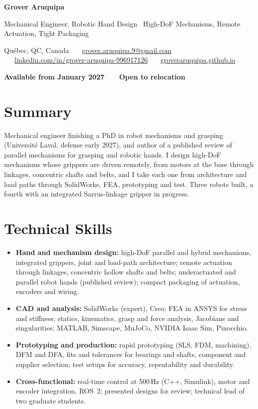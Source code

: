 \documentclass[10pt,letterpaper]{article}
\begin{document}
{\LARGE\bfseries Grover Aruquipa}\par\vspace{2pt}
{\large Mechanical Engineer, Robotic Hand Design \textbar\ High-DoF Mechanisms, Remote Actuation, Tight Packaging}\par\vspace{3pt}
{\small Qu\'ebec, QC, Canada \ \textbullet\ \
\href{mailto:grover.aruquipa.9@gmail.com}{grover.aruquipa.9@gmail.com} \ \textbullet\ \
\href{https://www.linkedin.com/in/grover-aruquipa-996917126}{linkedin.com/in/grover-aruquipa-996917126} \ \textbullet\ \
\href{https://groveraruquipa.github.io}{groveraruquipa.github.io}}\par\vspace{1pt}
{\small\bfseries Available from January 2027 \ \textbullet\ \ Open to relocation}\par


\section{Summary}
Mechanical engineer finishing a PhD in robot mechanisms and grasping (Universit\'e Laval, defense early 2027), and
author of a published review of parallel mechanisms for grasping and robotic hands. I design high-DoF mechanisms whose
grippers are driven remotely, from motors at the base through linkages, concentric shafts and belts, and I take each one
from architecture and load paths through SolidWorks, FEA, prototyping and test. Three robots built, a fourth with an
integrated Sarrus-linkage gripper in progress.

\section{Technical Skills}
\begin{itemize}
\item \textbf{Hand and mechanism design:} high-DoF parallel and hybrid mechanisms, integrated grippers, joint and load-path
architecture; remote actuation through linkages, concentric hollow shafts and belts; underactuated and parallel robot
hands (published review); compact packaging of actuation, encoders and wiring.
\item \textbf{CAD and analysis:} SolidWorks (expert), Creo; FEA in ANSYS for stress and stiffness; statics, kinematics,
grasp and force analysis, Jacobians and singularities; MATLAB, Simscape, MuJoCo, NVIDIA Isaac Sim, Pinocchio.
\item \textbf{Prototyping and production:} rapid prototyping (SLS, FDM, machining), DFM and DFA, fits and tolerances for
bearings and shafts, component and supplier selection; test setups for accuracy, repeatability and durability.
\item \textbf{Cross-functional:} real-time control at 500\,Hz (C++, Simulink), motor and encoder integration, ROS~2;
presented designs for review; technical lead of two graduate students.
\end{itemize}
\end{document}

